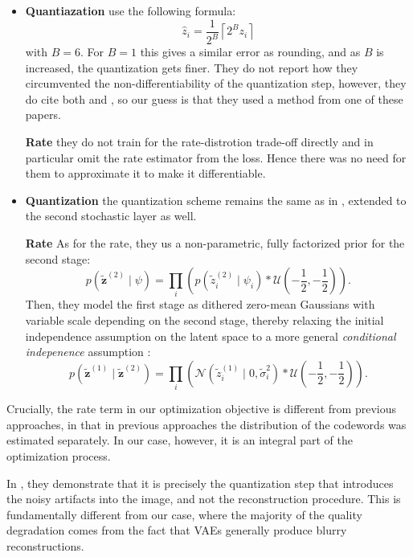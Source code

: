\documentclass{article}
\renewcommand{\vec}[1]{\mathbf{#1}}
\newcommand{\Norm}{\mathcal{N}}
\newcommand{\Unif}{\mathcal{U}}
\begin{document}
\begin{itemize}
\item
  \textbf{Quantiazation }
  \cite{rippel2017real} use the following formula:
  \[
    \hat{z}_i = \frac{1}{2^B}\left\lceil 2^Bz_i \right\rceil
  \]
  with $B = 6$. For $B = 1$ this gives a similar error as rounding, and as $B$
  is increased, the quantization gets finer. They do not report how they
  circumvented the non-differentiability of the quantization step, however, they
  do cite both \cite{balle2016end} and \cite{theis2017lossy}, so our guess is
  that they used a method from one of these papers.

  \textbf{Rate } they do not train for the rate-distrotion trade-off directly
  and in particular omit the rate estimator from the loss. Hence there was no
  need for them to approximate it to make it differentiable.
\item
  \textbf{Quantization }
  \cite{balle2018variational} the quantization scheme remains the same as in
  \cite{balle2016end}, extended to the second stochastic layer as well.

  \textbf{Rate } 
  As for the rate, they us a non-parametric, fully factorized prior for the
  second stage:
  \[
    p(\vec{\tilde{z}}^{(2)} \mid \psi) =
    \prod_i \left(  p\left(\tilde{z}^{(2)}_i \mid \psi_i\right) *
      \Unif\left(-\frac{1}{2}, -\frac{1}{2}\right)\right).
  \]
  Then, they model the first stage as dithered zero-mean Gaussians with variable
  scale depending on the second stage, thereby relaxing the initial independence
  assumption on the latent space to a more general \textit{conditional
    indepenence} assumption \cite{bishop1998latent}:
  \[
    p(\vec{\tilde{z}}^{(1)} \mid \vec{\tilde{z}}^{(2)}) = 
    \prod_i \left(  \Norm\left(\tilde{z}^{(1)}_i \mid 0, \tilde{\sigma}^2_i\right)*
      \Unif\left(-\frac{1}{2}, -\frac{1}{2}\right)\right).
  \]
\end{itemize}

Crucially, the rate term in our optimization objective is different from
previous approaches, in that in previous approaches the distribution of the
codewords was estimated separately. In our case, however, it is an integral part
of the optimization process.

In \cite{theis2017lossy}, they demonstrate that it is precisely the quantization
step that introduces the noisy artifacts into the image, and not the
reconstruction procedure. This is fundamentally different from our case, where
the majority of the quality degradation comes from the fact that VAEs generally
produce blurry reconstructions.
\end{document}
